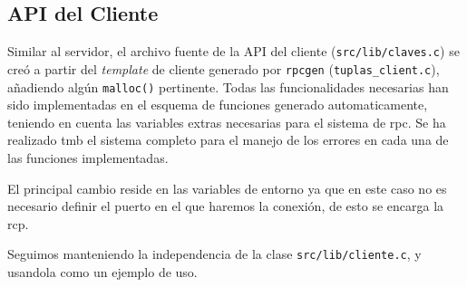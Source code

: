 \subsection{API del Cliente}
Similar al servidor, el archivo fuente de la API del cliente (\texttt{src/lib/claves.c}) se creó a partir del \textit{template} de cliente generado por \texttt{rpcgen} (\texttt{tuplas\_client.c}), añadiendo  algún \texttt{malloc()} pertinente. Todas las funcionalidades necesarias han sido implementadas en el esquema de funciones generado automaticamente, teniendo en cuenta las variables extras necesarias para el sistema de rpc. Se ha realizado tmb el sistema completo para el manejo de los errores en cada una de las funciones implementadas.

El principal cambio reside en las variables de entorno ya que en este caso no es necesario definir el puerto en el que haremos la conexión, de esto se encarga la rcp.

Seguimos manteniendo la independencia de la clase \texttt{src/lib/cliente.c}, y usandola como un ejemplo de uso. 
\newline